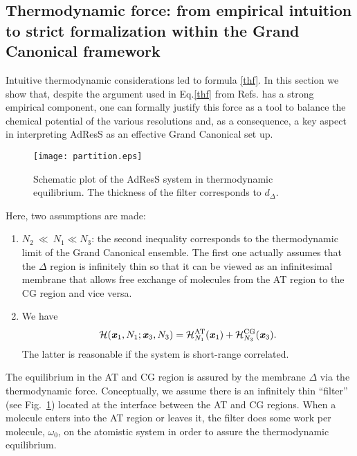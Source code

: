 \documentclass[aps,a4paper,reprint,onecolumn]{revtex4}
\newcommand{\vect}[1]{\textbf{\textit{#1}}}
\newcommand{\AT}{{\textrm{{AT}}}}
\newcommand{\CG}{{\textrm{CG}}}
\newcommand{\HY}{{\Delta}}
\begin{document}
\subsection{Thermodynamic force: from empirical intuition to strict formalization within the Grand Canonical framework}
Intuitive thermodynamic considerations led to formula \eqref{thf}. In this section we show that, despite the argument used in Eq.\ref{thf} from Refs.\cite{prlgc,rdfcorr} has a strong empirical component, one can formally justify this force
as a tool to balance the chemical potential of the various resolutions and, as a consequence,  a key aspect in interpreting AdResS as an effective Grand Canonical set up. 
\begin{figure}
  \centering
  \begin{minipage}[t]{0.49\linewidth}
  \texttt{[image: partition.eps]}    
  \end{minipage}
  \caption{Schematic plot of the AdResS system in thermodynamic equilibrium. The thickness of the filter corresponds to $d_{\Delta}$.}
  \label{fig:tmp1}
\end{figure}
Here, two assumptions are made:
\begin{enumerate}
\item $N_2\ {\ll}\ N_1 \ll N_3$: the second inequality corresponds to
  the thermodynamic limit of the Grand Canonical ensemble. The first
  one actually assumes that the $\HY$ region is infinitely thin so that it
  can be viewed as an infinitesimal membrane that allows free exchange of molecules from
  the AT region to the CG region and vice versa.
\item We have 
  \begin{equation}
    \mathcal H(\vect x_1, N_1; \vect x_3, N_3) =
    \mathcal H_{N_1}^{\AT}(\vect x_1) + \mathcal H_{N_3}^{\CG}(\vect x_3). 
  \end{equation}
  The latter is reasonable if the system is
  short-range correlated.
  
\end{enumerate}
The equilibrium in the AT and CG region is assured by the membrane $\HY$ via the thermodynamic force. Conceptually, we assume there is an infinitely thin
``filter'' (see Fig.~\ref{fig:tmp1}) located at the interface between
the AT and CG regions. When a molecule enters into
the AT region or leaves it, the filter does some work per molecule, $\omega_0$, on the atomistic system in order to assure the thermodynamic equilibrium.
\end{document}

